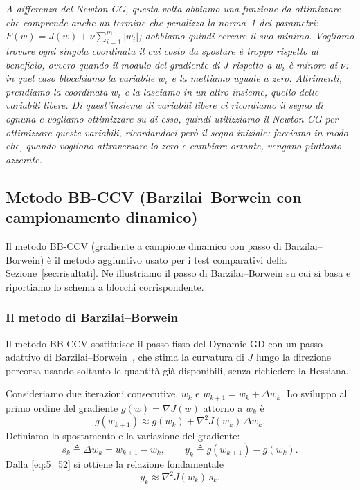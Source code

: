 \documentclass[a4paper,12pt]{article}
\numberwithin{equation}{section}
\numberwithin{figure}{section}
\numberwithin{table}{section}
\begin{document}
\textit{A differenza del Newton-CG, questa volta abbiamo una funzione da
ottimizzare che comprende anche un termine che penalizza la norma~1 dei
parametri: $F(w) = J(w) + \nu\sum_{i=1}^{m}|w_i|$; dobbiamo quindi cercare il
suo minimo. Vogliamo trovare ogni singola coordinata il cui costo da spostare
è troppo rispetto al beneficio, ovvero quando il modulo del gradiente di $J$
rispetto a $w_i$ è minore di $\nu$: in quel caso blocchiamo la variabile $w_i$
e la mettiamo uguale a zero. Altrimenti, prendiamo la coordinata $w_i$ e la
lasciamo in un altro insieme, quello delle variabili libere. Di quest'insieme
di variabili libere ci ricordiamo il segno di ognuna e vogliamo ottimizzare su
di esso, quindi utilizziamo il Newton-CG per ottimizzare queste variabili,
ricordandoci però il segno iniziale: facciamo in modo che, quando vogliono
attraversare lo zero e cambiare ortante, vengano piuttosto azzerate.}

\subsection{Metodo BB-CCV (Barzilai--Borwein con campionamento dinamico)}\label{sec:bbccv}

Il metodo BB-CCV (gradiente a campione dinamico con passo di
Barzilai--Borwein) è il metodo aggiuntivo usato per i test comparativi della
Sezione~\ref{sec:risultati}. Ne illustriamo il passo di Barzilai--Borwein su
cui si basa e riportiamo lo schema a blocchi corrispondente.

\subsubsection{Il metodo di Barzilai--Borwein}\label{sec:bb}

Il metodo BB-CCV sostituisce il passo fisso del Dynamic GD con un passo
adattivo di Barzilai--Borwein~\cite{barzilai1988}, che stima la curvatura di
$J$ lungo la direzione percorsa usando soltanto le quantità già disponibili,
senza richiedere la Hessiana.

Consideriamo due iterazioni consecutive, $w_k$ e $w_{k+1} = w_k + \Delta w_k$.
Lo sviluppo al primo ordine del gradiente $g(w) = \nabla J(w)$ attorno a $w_k$
è
\[
g(w_{k+1}) \approx g(w_k) + \nabla^2 J(w_k)\, \Delta w_k. \tag{5.52}\label{eq:5_52}
\]
Definiamo lo spostamento e la variazione del gradiente:
\[
s_k \triangleq \Delta w_k = w_{k+1} - w_k, \qquad
y_k \triangleq g(w_{k+1}) - g(w_k). \tag{5.53}\label{eq:5_53}
\]
Dalla \eqref{eq:5_52} si ottiene la relazione fondamentale
\[
y_k \approx \nabla^2 J(w_k)\, s_k. \tag{5.54}\label{eq:5_54}
\]
\end{document}
